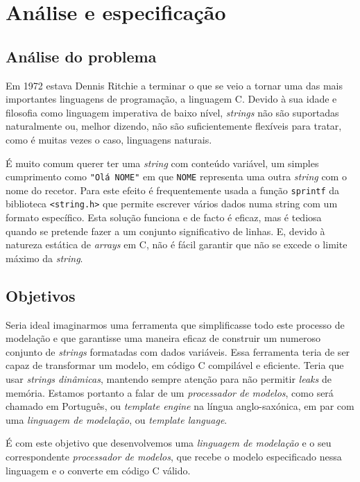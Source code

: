\chapter{Análise e especificação}

\section{Análise do problema}
Em 1972 estava Dennis Ritchie a terminar o que se veio a tornar uma das mais importantes linguagens de programação, a linguagem C. Devido à sua idade e filosofia como linguagem imperativa de baixo nível, \textit{strings} não são suportadas naturalmente ou, melhor dizendo, não são suficientemente flexíveis para tratar, como é muitas vezes o caso, linguagens naturais.

É muito comum querer ter uma \textit{string} com conteúdo variável, um simples cumprimento como \texttt{"Olá NOME"} em que \texttt{NOME} representa uma outra \textit{string} com o nome do recetor. Para este efeito é frequentemente usada a função \texttt{sprintf} da biblioteca \texttt{<string.h>} que permite escrever vários dados numa string com um formato específico. Esta solução funciona e de facto é eficaz, mas é tediosa quando se pretende fazer a um conjunto significativo de linhas. E, devido à natureza estática de \textit{arrays} em C, não é fácil garantir que não se excede o limite máximo da \textit{string}.

\section{Objetivos}
Seria ideal imaginarmos uma ferramenta que simplificasse todo este processo de modelação e que garantisse uma maneira eficaz de construir um numeroso conjunto de \textit{strings} formatadas com dados variáveis. Essa ferramenta teria de ser capaz de transformar um modelo, em código C compilável e eficiente. Teria que usar \emph{strings dinâmicas}, mantendo sempre atenção para não permitir \textit{leaks} de memória. Estamos portanto a falar de um \emph{processador de modelos}, como será chamado em Português, ou \textit{template engine} na língua anglo-saxónica, em par com uma \emph{linguagem de modelação}, ou \textit{template language}.

É com este objetivo que desenvolvemos uma \textit{linguagem de modelação} e o seu correspondente \textit{processador de modelos}, que recebe o modelo especificado nessa linguagem e o converte em código C válido.

